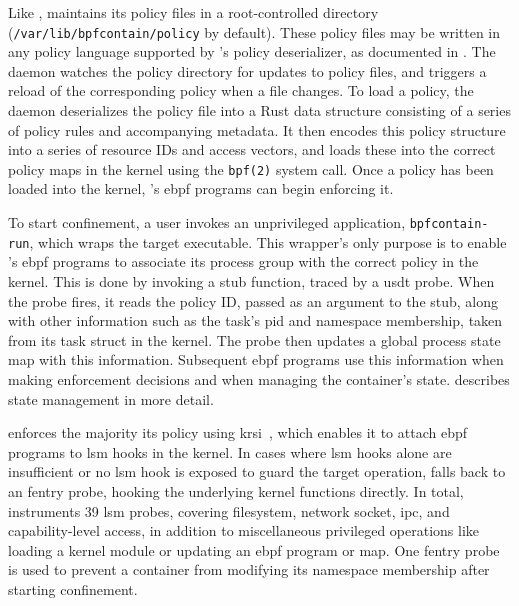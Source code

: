 Like \bpfbox{}, \bpfcontain{} maintains its policy files in a root-controlled directory
(\texttt{/var/lib/bpfcontain/policy} by default). These policy files may be written in any
policy language supported by \bpfcontain{}'s policy deserializer, as documented in
. The \bpfcontain{} daemon watches the policy directory for
updates to policy files, and triggers a reload of the corresponding policy when a file
changes. To load a policy, the daemon deserializes the policy file into a Rust data
structure consisting of a series of policy rules and accompanying metadata. It then
encodes this policy structure into a series of resource IDs and access vectors, and loads
these into the correct policy maps in the kernel using the \texttt{bpf(2)} system call.
Once a policy has been loaded into the kernel, \bpfcontain{}'s \gls{ebpf} programs can
begin enforcing it.

To start confinement, a user invokes an unprivileged application, \texttt{bpfcontain-run},
which wraps the target executable. This wrapper's only purpose is to enable
\bpfcontain{}'s \gls{ebpf} programs to associate its process group with the correct policy
in the kernel.  This is done by invoking a stub function, traced by a \gls{usdt} probe.
When the probe fires, it reads the policy ID, passed as an argument to the stub, along
with other information such as the task's \gls{pid} and namespace membership, taken from
its task struct in the kernel. The probe then updates a global process state map with this
information. Subsequent \gls{ebpf} programs use this information when making enforcement
decisions and when managing the container's state.  describes
state management in more detail.

\bpfcontain{} enforces the majority its policy using \gls{krsi}~\cite{singh2019_krsi},
which enables it to attach \gls{ebpf} programs to \gls{lsm} hooks in the kernel. In cases
where \gls{lsm} hooks alone are insufficient or no \gls{lsm} hook is exposed to guard the
target operation, \bpfcontain{} falls back to an fentry probe, hooking the underlying
kernel functions directly. In total, \bpfcontain{} instruments 39 \gls{lsm} probes,
covering filesystem, network socket, \gls{ipc}, and capability-level access, in addition
to miscellaneous privileged operations like loading a kernel module or updating an
\gls{ebpf} program or map.  One fentry probe is used to prevent a container from modifying
its namespace membership after starting confinement.

